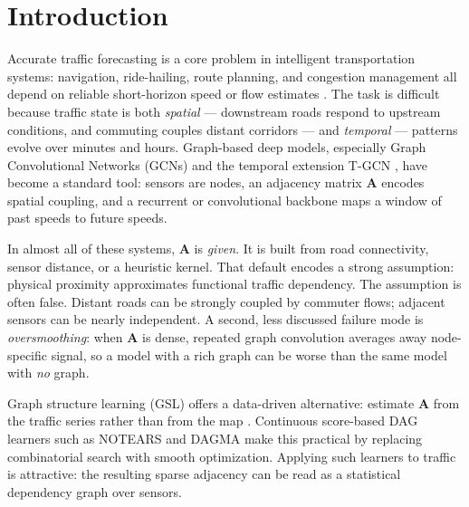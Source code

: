 \section{Introduction}\label{sec:intro}

Accurate traffic forecasting is a core problem in intelligent transportation
systems: navigation, ride-hailing, route planning, and congestion management
all depend on reliable short-horizon speed or flow estimates
\citep{akhtar2021review}. The task is difficult because traffic state is
both \emph{spatial} --- downstream roads respond to upstream conditions, and
commuting couples distant corridors --- and \emph{temporal} --- patterns
evolve over minutes and hours. Graph-based deep models, especially Graph
Convolutional Networks (GCNs) \citep{kipf2017semi} and the temporal
extension T-GCN \citep{zhao2019t}, have become a standard tool: sensors are
nodes, an adjacency matrix $\mathbf{A}$ encodes spatial coupling, and a
recurrent or convolutional backbone maps a window of past speeds to future
speeds.

In almost all of these systems, $\mathbf{A}$ is \emph{given}. It is built
from road connectivity, sensor distance, or a heuristic kernel. That default
encodes a strong assumption: physical proximity approximates functional
traffic dependency. The assumption is often false. Distant roads can be
strongly coupled by commuter flows; adjacent sensors can be nearly
independent. A second, less discussed failure mode is \emph{oversmoothing}:
when $\mathbf{A}$ is dense, repeated graph convolution averages away
node-specific signal, so a model with a rich graph can be worse than the
same model with \emph{no} graph.

Graph structure learning (GSL) offers a data-driven alternative: estimate
$\mathbf{A}$ from the traffic series rather than from the map
\citep{Chen2022}. Continuous score-based DAG learners such as NOTEARS
\citep{zheng2018dags} and DAGMA \citep{Bello2024DAGMA} make this practical
by replacing combinatorial search with smooth optimization. Applying such
learners to traffic is attractive: the resulting sparse adjacency can be
read as a statistical dependency graph over sensors.

